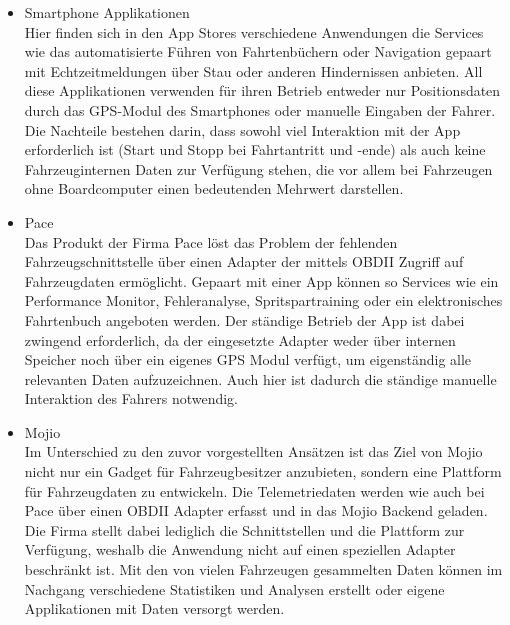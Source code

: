 \begin{itemize}
\item Smartphone Applikationen \\
Hier finden sich in den App Stores verschiedene Anwendungen die Services wie das automatisierte Führen von Fahrtenbüchern\cite{MCT2016} oder Navigation gepaart mit Echtzeitmeldungen über Stau oder anderen Hindernissen anbieten\cite{Mobile2006}. All diese Applikationen verwenden für ihren Betrieb entweder nur Positionsdaten durch das \ac{GPS}-Modul des Smartphones oder manuelle Eingaben der Fahrer. Die Nachteile bestehen darin, dass sowohl viel Interaktion mit der App erforderlich ist (Start und Stopp bei Fahrtantritt und -ende) als auch keine Fahrzeuginternen Daten zur Verfügung stehen, die vor allem bei Fahrzeugen ohne Boardcomputer einen bedeutenden Mehrwert darstellen.
\item Pace\cite{GmbH2018}\\
Das Produkt der Firma Pace löst das Problem der fehlenden Fahrzeugschnittstelle über einen Adapter der mittels \ac{OBD}II Zugriff auf Fahrzeugdaten ermöglicht. Gepaart mit einer App können so Services wie ein Performance Monitor, Fehleranalyse, Spritspartraining oder ein elektronisches Fahrtenbuch angeboten werden. Der ständige Betrieb der App ist dabei zwingend erforderlich, da der eingesetzte Adapter weder über internen Speicher noch über ein eigenes GPS Modul verfügt, um eigenständig alle relevanten Daten aufzuzeichnen. Auch hier ist dadurch die ständige manuelle Interaktion des Fahrers notwendig.
\item Mojio\cite{mojio2018}\\
Im Unterschied zu den zuvor vorgestellten Ansätzen ist das Ziel von Mojio nicht nur ein Gadget für Fahrzeugbesitzer anzubieten, sondern eine Plattform für Fahrzeugdaten zu entwickeln. Die Telemetriedaten werden wie auch bei Pace über einen OBDII Adapter erfasst und in das Mojio Backend geladen. Die Firma stellt dabei lediglich die Schnittstellen und die Plattform zur Verfügung, weshalb die Anwendung nicht auf einen speziellen Adapter beschränkt ist. Mit den von vielen Fahrzeugen gesammelten Daten können im Nachgang verschiedene Statistiken und Analysen erstellt oder eigene Applikationen mit Daten versorgt werden.
\end{itemize}

